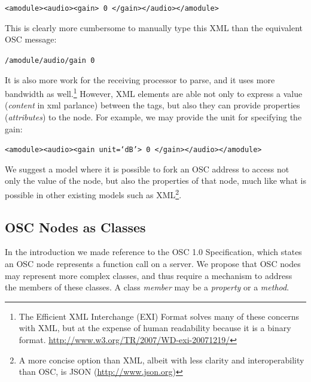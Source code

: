 \documentclass{NIME-alternate}
\begin{document}
\begin{Abstract}
\texttt{<amodule><audio><gain> 0 </gain></audio></amodule>}

This is clearly more cumbersome to manually type this XML than the equivalent OSC message:

\texttt{/amodule/audio/gain 0}

It is also more work for the receiving processor to parse, and it uses more bandwidth as well.\footnote{The Efficient XML Interchange (EXI) Format solves many of these concerns with XML, but at the expense of human readability because it is a binary format.  \url{http://www.w3.org/TR/2007/WD-exi-20071219/}} However, XML elements are able not only to express a value (\emph{content} in xml parlance) between the tags, but also they can provide properties (\emph{attributes}) to the node. For example, we may provide the unit for specifying the gain:

\texttt{<amodule><audio><gain unit=`dB'> 0 </gain></audio></amodule>}

We suggest a model where it is possible to fork an OSC address to access not only the value of the node, but also the properties of that node, much like what is possible in other existing models such as XML\footnote{A more concise option than XML, albeit with less clarity and interoperability than OSC, is JSON (\url{http://www.json.org})}.  



\subsection{OSC Nodes as Classes} %
\label{sub:osc_nodes_as_classes}

In the introduction we made reference to the OSC 1.0 Specification, which states an OSC node represents a function call on a server. We propose that OSC nodes may represent more complex classes, and thus require a mechanism to address the members of these classes. A class \emph{member} may be a \emph{property} or a \emph{method}.


\end{Abstract}
\end{document}
